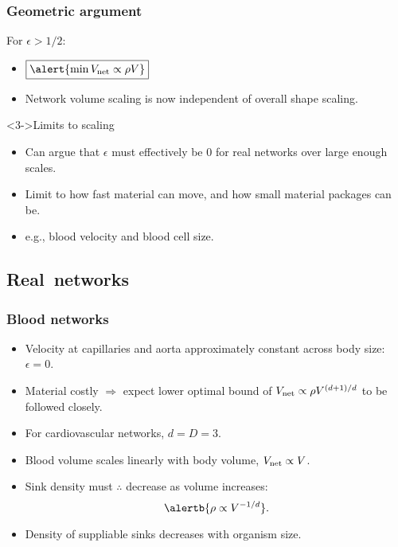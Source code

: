 \begin{frame}
  \frametitle{Geometric argument}

  \begin{block}{For $\epsilon > 1/2$:}
    \begin{itemize}
    \item<1-> 
      $
      \boxed{\alert{
          \min V_{\textnormal{net}} 
          \propto
          \rho V
        }}
      $
    \item<2-> 
      Network volume scaling is now independent 
      of overall shape scaling.
    \end{itemize}
  \end{block}

  \medskip

  \begin{block}<3->{Limits to scaling}
    \begin{itemize}
    \item 
      Can argue that $\epsilon$ must effectively be 0
      for real networks over large enough scales.
    \item 
      Limit to how fast material can move,
      and how small material packages can be.
    \item 
      e.g., blood velocity and blood cell size.
    \end{itemize}
  \end{block}
\end{frame}


\subsection{Real\ networks}

\begin{frame}
  \frametitle{Blood networks}

  \begin{itemize}
  \item<1-> Velocity at capillaries and 
    aorta approximately constant across body size\cite{weinberg2006a}: 
    $\epsilon = 0$.
  \item<2-> \alert{Material costly} $\Rightarrow$ expect lower optimal bound of 
    $V_{\textnormal{net}} \propto \rho V^{(d+1)/d}$ to be followed closely.
  \item<3->
    For cardiovascular networks, \alert{$d=D=3$}.
  \item<4->
    Blood volume scales linearly with body
    volume\cite{stahl1967a}, $V_{\textnormal{net}} \propto V$.
  \item<5->
    Sink density must $\therefore$ decrease as volume increases:
    $$
    \alertb{\rho \propto V^{-1/d}}.
    $$
  \item<6->
    Density of suppliable sinks \alert{decreases} with organism size.
  \end{itemize}      

\end{frame}


